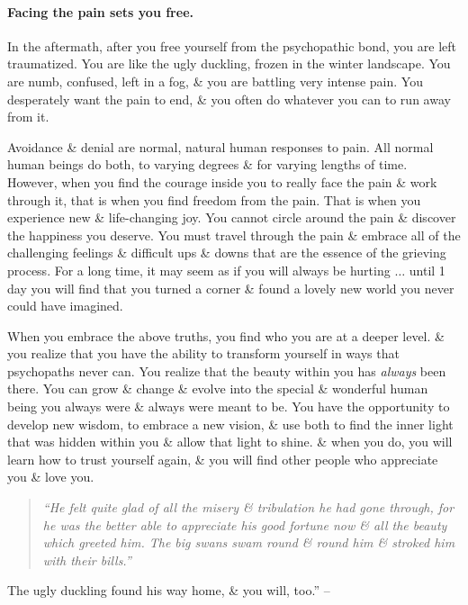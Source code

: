 \documentclass{article}
\numberwithin{equation}{section}
\begin{document}
\paragraph{Facing the pain sets you free.} In the aftermath, after you free yourself from the psychopathic bond, you are left traumatized. You are like the ugly duckling, frozen in the winter landscape. You are numb, confused, left in a fog, \& you are battling very intense pain. You desperately want the pain to end, \& you often do whatever you can to run away from it.
	
Avoidance \& denial are normal, natural human responses to pain. All normal human beings do both, to varying degrees \& for varying lengths of time. However, when you find the courage inside you to really face the pain \& work through it, that is when you find freedom from the pain. That is when you experience new \& life-changing joy. You cannot circle around the pain \& discover the happiness you deserve. You must travel through the pain \& embrace all of the challenging feelings \& difficult ups \& downs that are the essence of the grieving process. For a long time, it may seem as if you will always be hurting $\ldots$ until 1 day you will find that you turned a corner \& found a lovely new world you never could have imagined.

When you embrace the above truths, you find who you are at a deeper level. \& you realize that you have the ability to transform yourself in ways that psychopaths never can. You realize that the beauty within you has \textit{always} been there. You can grow \& change \& evolve into the special \& wonderful human being you always were \& always were meant to be. You have the opportunity to develop new wisdom, to embrace a new vision, \& use both to find the inner light that was hidden within you \& allow that light to shine. \& when you do, you will learn how to trust yourself again, \& you will find other people who appreciate you \& love you.
\begin{quotation}\it
	``He felt quite glad of all the misery \& tribulation he had gone through, for he was the better able to appreciate his good fortune now \& all the beauty which greeted him. The big swans swam round \& round him \& stroked him with their bills.''
\end{quotation}
The ugly duckling found his way home, \& you will, too.'' -- \cite[pp. 166--169]{MacKenzie2015}
\end{document}
